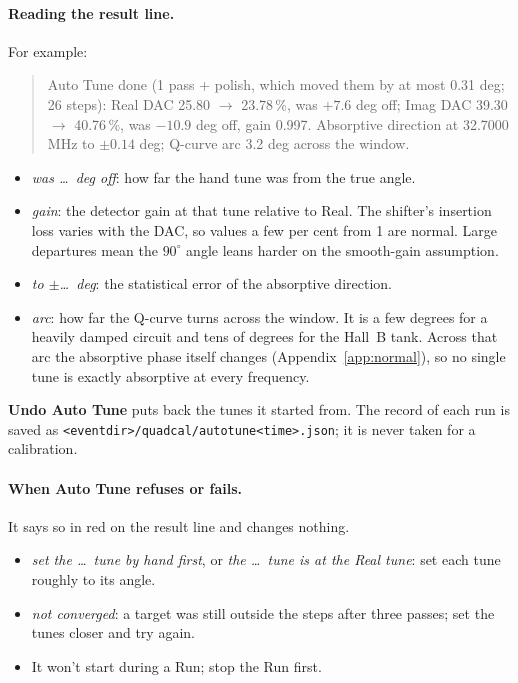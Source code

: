 \documentclass[11pt]{article}
\newcommand{\code}[1]{\texttt{\begingroup\def\_{\textunderscore\allowbreak}#1\endgroup}}
\newcommand{\btn}[1]{\textsf{\textbf{#1}}}   %
\begin{document}
\paragraph{Reading the result line.} For example:
\begin{quote}\small
Auto Tune done (1 pass + polish, which moved them by at most 0.31 deg; 26 steps): Real DAC 25.80 $\to$
23.78\,\%, was $+7.6$ deg off; Imag DAC 39.30 $\to$ 40.76\,\%, was $-10.9$ deg off, gain 0.997. Absorptive direction at 32.7000 MHz to $\pm0.14$ deg; Q-curve arc
3.2 deg across the window.
\end{quote}
\begin{itemize}
\item \emph{was \ldots\ deg off}: how far the hand tune was from the true angle.
\item \emph{gain}: the detector gain at that tune relative to Real. The shifter's insertion loss varies with
  the DAC, so values a few per cent from 1 are normal. Large departures mean the $90^\circ$ angle leans harder on
  the smooth-gain assumption.
\item \emph{to $\pm$\ldots\ deg}: the statistical error of the absorptive direction.
\item \emph{arc}: how far the Q-curve turns across the window. It is a few degrees for a heavily damped
  circuit and tens of degrees for the Hall~B tank. Across that arc the absorptive phase itself changes
  (Appendix~\ref{app:normal}), so no single tune is exactly absorptive at every frequency.
\end{itemize}
\btn{Undo Auto Tune} puts back the tunes it started from. The record of each run is saved as
\code{<event\_dir>/quad\_cal/autotune\_<time>.json}; it is never taken for a calibration.

\paragraph{When Auto Tune refuses or fails.} It says so in red on the result line and changes nothing.
\begin{itemize}
\item \emph{set the \ldots\ tune by hand first}, or \emph{the \ldots\ tune is at the Real tune}: set each tune
  roughly to its angle.
\item \emph{not converged}: a target was still outside the steps after three passes; set the tunes closer and
  try again.
\item It won't start during a Run; stop the Run first.
\end{itemize}
\end{document}
